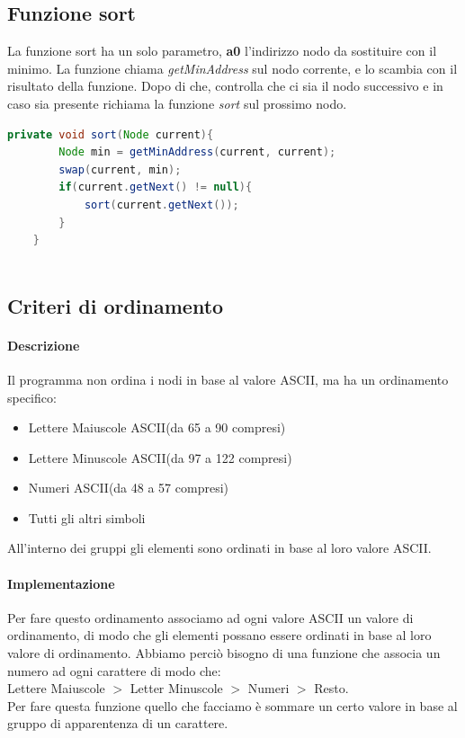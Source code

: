 \subsection{Funzione sort}
La funzione sort ha un solo parametro, \textbf{a0} l'indirizzo nodo da sostituire con il minimo.
La funzione chiama \textit{getMinAddress} sul nodo corrente, e lo scambia con il risultato della funzione.
Dopo di che, controlla che ci sia il nodo successivo e in caso sia presente richiama la funzione \textit{sort} sul prossimo nodo.
\\
\begin{lstlisting}[language=java,caption={Codice java algoritmo sort}, captionpos=b]
    private void sort(Node current){
        Node min = getMinAddress(current, current);
        swap(current, min);
        if(current.getNext() != null){
            sort(current.getNext());
        }
    }
    
\end{lstlisting}

\subsection{Criteri di ordinamento}
\paragraph{Descrizione}
Il programma non ordina i nodi in base al valore ASCII, ma ha un ordinamento specifico:
\begin{itemize}
    \item Lettere Maiuscole ASCII(da 65 a 90 compresi)
    \item Lettere Minuscole ASCII(da 97 a 122 compresi)
    \item Numeri ASCII(da 48 a 57 compresi)
    \item Tutti gli altri simboli
\end{itemize}
All'interno dei gruppi gli elementi sono ordinati in base al loro valore ASCII.

\paragraph{Implementazione}
Per fare questo ordinamento associamo ad ogni valore ASCII un valore di ordinamento, 
di modo che gli elementi possano essere ordinati in base al loro valore di ordinamento.
Abbiamo perciò bisogno di una funzione che associa un numero ad ogni carattere di modo che:\\
Lettere Maiuscole $>$ Letter Minuscole $>$ Numeri $>$ Resto.
\\
Per fare questa funzione quello che facciamo è sommare un certo valore in base al gruppo di apparentenza di un carattere.

